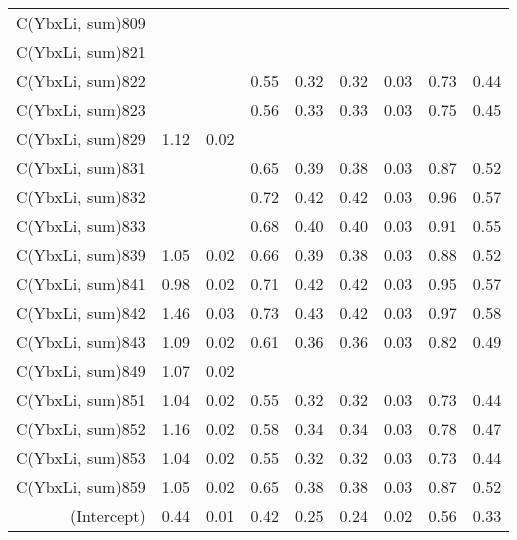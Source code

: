 \begin{table}[p]
\begin{tabular}{rrrrrrrrr}
  C(YbxLi, sum)809 &  &  &  &  &  &  &  &  \\ 
  C(YbxLi, sum)821 &  &  &  &  &  &  &  &  \\ 
  C(YbxLi, sum)822 &  &  & 0.55 & 0.32 & 0.32 & 0.03 & 0.73 & 0.44 \\ 
  C(YbxLi, sum)823 &  &  & 0.56 & 0.33 & 0.33 & 0.03 & 0.75 & 0.45 \\ 
  C(YbxLi, sum)829 & 1.12 & 0.02 &  &  &  &  &  &  \\ 
  C(YbxLi, sum)831 &  &  & 0.65 & 0.39 & 0.38 & 0.03 & 0.87 & 0.52 \\ 
  C(YbxLi, sum)832 &  &  & 0.72 & 0.42 & 0.42 & 0.03 & 0.96 & 0.57 \\ 
  C(YbxLi, sum)833 &  &  & 0.68 & 0.40 & 0.40 & 0.03 & 0.91 & 0.55 \\ 
  C(YbxLi, sum)839 & 1.05 & 0.02 & 0.66 & 0.39 & 0.38 & 0.03 & 0.88 & 0.52 \\ 
  C(YbxLi, sum)841 & 0.98 & 0.02 & 0.71 & 0.42 & 0.42 & 0.03 & 0.95 & 0.57 \\ 
  C(YbxLi, sum)842 & 1.46 & 0.03 & 0.73 & 0.43 & 0.42 & 0.03 & 0.97 & 0.58 \\ 
  C(YbxLi, sum)843 & 1.09 & 0.02 & 0.61 & 0.36 & 0.36 & 0.03 & 0.82 & 0.49 \\ 
  C(YbxLi, sum)849 & 1.07 & 0.02 &  &  &  &  &  &  \\ 
  C(YbxLi, sum)851 & 1.04 & 0.02 & 0.55 & 0.32 & 0.32 & 0.03 & 0.73 & 0.44 \\ 
  C(YbxLi, sum)852 & 1.16 & 0.02 & 0.58 & 0.34 & 0.34 & 0.03 & 0.78 & 0.47 \\ 
  C(YbxLi, sum)853 & 1.04 & 0.02 & 0.55 & 0.32 & 0.32 & 0.03 & 0.73 & 0.44 \\ 
  C(YbxLi, sum)859 & 1.05 & 0.02 & 0.65 & 0.38 & 0.38 & 0.03 & 0.87 & 0.52 \\ 
  (Intercept) & 0.44 & 0.01 & 0.42 & 0.25 & 0.24 & 0.02 & 0.56 & 0.33 \\ 
   \hline
\end{tabular}
\end{table}
